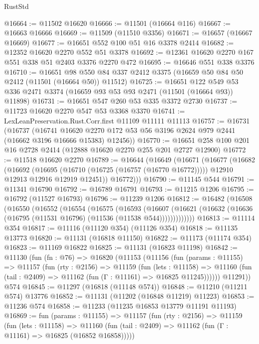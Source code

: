 \begin{lexlean}{RustStd}
\begin{coremodule}
@16664 := @11502 @16620
@16666 := @11501 (@16664 @116)
@16667 := @16663 @16666
@16669 := @11509 (@11510 @3356)
@16671 := @16657 (@16667 @16669)
@16677 := @16651 @552 @100 @51 @16 @3378 @2414
@16682 := @12352 @16620 @2270 @552 @51 @3378
@16692 := @12361 @16620 @2270 @167 @551 @338 @51 @2403 @3376 @2270 @472
@16695 := @16646 @551 @338 @3376
@16710 := @16651
    @98
    @550
    @84
    @337
    @2412
    @3375
    (@16659 @50 @84 @50 @2412 (@11501 (@16664 @50)) @11512)
@16725 := @16651
    @122
    @549
    @53
    @336
    @2471
    @3374
    (@16659 @93 @53 @93 @2471 (@11501 (@16664 @93)) @11898)
@16731 := @16651 @547 @260 @53 @335 @3372 @2730
@16737 := @11723 @16620 @2270 @547 @53 @3368 @3370
@16741 := LexLeanPreservation.Rust.Corr.first @11109 @11111 @11113
@16757 := @16731
    (@16737
      (@16741 @16620 @2270 @172 @53 @56 @3196 @2624 @979 @2441 (@16662 @3196 @16666 @15383) @12456))
@16770 := @16651 @258 @100 @201 @16 @2728 @2414 (@12888 @16620 @2270 @255 @201 @2727 @12900)
@16772 := @11518 @16620 @2270
@16789 := @16644
    (@16649
      (@16671
        (@16677
          (@16682
            (@16692
              (@16695 (@16710 (@16725 (@16757 (@16770 @16772)))))
              @12910
              @12913
              @12916
              @12919
              @12451))
          @16772)))
@16790 := @11145 @544
@16791 := @11341 @16790
@16792 := @16789 @16791
@16793 := @11215 @1206
@16795 := @16792 (@11527 @16793)
@16796 := @11239 @1206
@16812 := @16482
    (@16508
      (@16550
        (@16552
          (@16554
            (@16575
              (@16593
                (@16607
                  (@16621 (@16632 (@16636 (@16795 (@11531 @16796) (@11536 (@11538 @544)))))))))))))
@16813 := @11114 @354
@16817 := @11116 (@11120 @354) (@11126 @354)
@16818 := @11135 @13773
@16820 := @11131 (@16818 @11150)
@16822 := @11173 (@11174 @354)
@16823 := @11169 @16822
@16825 := @11131 (@16823 @11198)
@16842 := @11130
    (fun (fn : @76) =>
    @16820
      (@11153
        (@11156
          (fun (params : @11155) =>
          @11157
            (fun (rty : @2156) =>
            @11159
              (fun (lets : @11158) =>
              @11160 (fun (tail : @2409) => @11162 (fun (Γ : @11161) => @16825 @11245))))))
        @11291))
    @574
@16845 := @11297 (@16818 (@11148 @574))
@16848 := @11210 (@11211 @574) @13776
@16852 := @11131 (@11202 (@16848 @11219) @11223)
@16853 := @11236 @574
@16858 := @11233 (@11235 @16853 @13779 @11191 @11193)
@16869 := fun (params : @11155) =>
  @11157
    (fun (rty : @2156) =>
    @11159
      (fun (lets : @11158) =>
      @11160 (fun (tail : @2409) => @11162 (fun (Γ : @11161) => @16825 (@16852 @16858)))))

\end{coremodule}
\end{lexlean}
